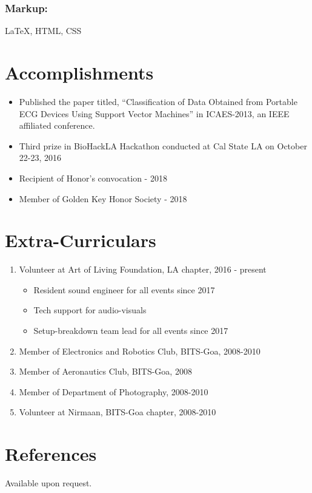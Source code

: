 \documentclass{article}
\begin{document}
\subsubsection{Markup:} 
{\LaTeX}, HTML, CSS


\section{Accomplishments}
\begin{itemize}
    \item Published the paper titled, “Classification of Data Obtained from Portable ECG Devices Using Support Vector Machines” in ICAES-2013, an IEEE affiliated conference.
    \item Third prize in BioHackLA Hackathon conducted at Cal State LA on October 22-23, 2016
    \item Recipient of Honor's convocation - 2018
    \item Member of Golden Key Honor Society - 2018
\end{itemize}

\section{Extra-Curriculars}
\begin{enumerate}
    \item Volunteer at Art of Living Foundation, LA chapter, 2016 - present
    \begin{itemize}
        \item Resident sound engineer for all events since 2017
        \item Tech support for audio-visuals
        \item Setup-breakdown team lead for all events since 2017
    \end{itemize}
    \item Member of Electronics and Robotics Club, BITS-Goa, 2008-2010
    \item Member of Aeronautics Club, BITS-Goa, 2008
    \item Member of Department of Photography, 2008-2010
    \item Volunteer at Nirmaan, BITS-Goa chapter, 2008-2010
\end{enumerate}


\section{References}
Available upon request.
\end{document}
